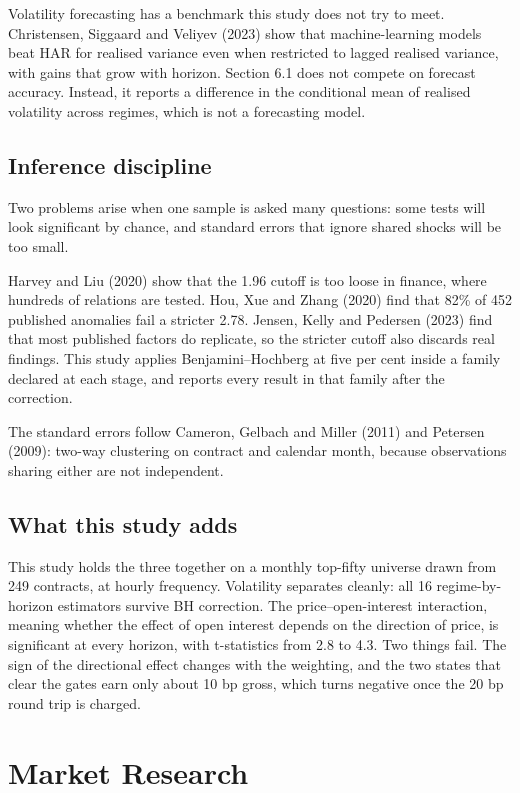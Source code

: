 \documentclass[11pt,a4paper]{article}
\begin{document}
Volatility forecasting has a benchmark this study does not try to meet. Christensen, Siggaard and Veliyev (2023) show that machine-learning models beat HAR for realised variance even when restricted to lagged realised variance, with gains that grow with horizon. Section 6.1 does not compete on forecast accuracy. Instead, it reports a difference in the conditional mean of realised volatility across regimes, which is not a forecasting model.

\subsection{Inference discipline}

Two problems arise when one sample is asked many questions: some tests will look significant by chance, and standard errors that ignore shared shocks will be too small.

Harvey and Liu (2020) show that the 1.96 cutoff is too loose in finance, where hundreds of relations are tested. Hou, Xue and Zhang (2020) find that 82\% of 452 published anomalies fail a stricter 2.78. Jensen, Kelly and Pedersen (2023) find that most published factors do replicate, so the stricter cutoff also discards real findings. This study applies Benjamini--Hochberg at five per cent inside a family declared at each stage, and reports every result in that family after the correction.

The standard errors follow Cameron, Gelbach and Miller (2011) and Petersen (2009): two-way clustering on contract and calendar month, because observations sharing either are not independent.

\subsection{What this study adds}

This study holds the three together on a monthly top-fifty universe drawn from 249 contracts, at hourly frequency. Volatility separates cleanly: all 16 regime-by-horizon estimators survive BH correction. The price--open-interest interaction, meaning whether the effect of open interest depends on the direction of price, is significant at every horizon, with t-statistics from 2.8 to 4.3. Two things fail. The sign of the directional effect changes with the weighting, and the two states that clear the gates earn only about 10 bp gross, which turns negative once the 20 bp round trip is charged.

\section{Market Research}
\end{document}
